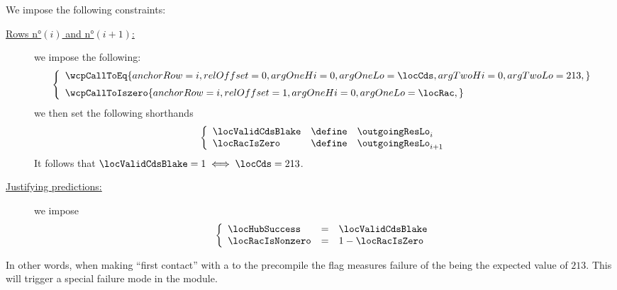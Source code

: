We impose the following constraints:
\begin{description}
	\item[\underline{Rows n°$(i)$ and n°$(i + 1)$:}]
		we impose the following:
		\[
			\left\{ \begin{array}{l}
				\wcpCallToEq {
					anchorRow = i       ,
					relOffset = 0       ,
					argOneHi  = 0       ,
					argOneLo  = \locCds ,
					argTwoHi  = 0       ,
					argTwoLo  = 213     ,
				}
				\vspace{2mm} \\
				\wcpCallToIszero {
					anchorRow = i       ,
					relOffset = 1       ,
					argOneHi  = 0       ,
					argOneLo  = \locRac ,
				}
				\\
			\end{array} \right.
		\]
		we then set the following shorthands
		\[
			\left\{ \begin{array}{lcl}
				\locValidCdsBlake & \define & \outgoingResLo  _{i    } \\
				\locRacIsZero     & \define & \outgoingResLo  _{i + 1} \\
			\end{array} \right.
		\]
		It follows that $\locValidCdsBlake = 1 \iff \locCds = 213$.
	\item[\underline{Justifying \hubMod{} predictions:}]
		we impose
		\[
			\left\{ \begin{array}{lcl}
				\locHubSuccess   & = & \locValidCdsBlake \\
				\locRacIsNonzero & = & 1 - \locRacIsZero \\
			\end{array} \right.
		\]
\end{description}
In other words, when making ``first contact'' with a  to the \instBlake{} precompile the
\locValidCdsBlake{} flag measures failure of the \cds{} being the expected value of $213$. This will trigger a special failure mode in the \hubMod{} module. 
